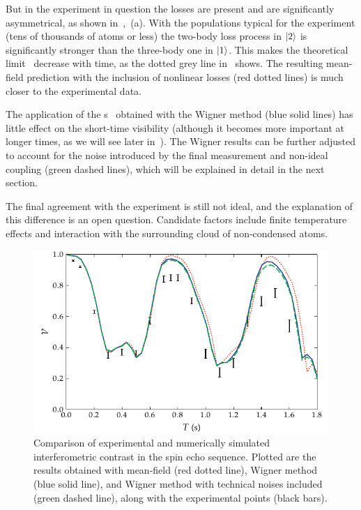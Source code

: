 But in the experiment in question the losses are present and are significantly asymmetrical, as shown in~,~(a).
With the populations typical for the experiment (tens of thousands of atoms or less) the two-body loss process in $\mbox{\ensuremath{\vert 2 \rangle}}$ is significantly stronger than the three-body one in $\mbox{\ensuremath{\vert 1 \rangle}}$.
This makes the theoretical limit~ decrease with time, as the dotted grey line in~ shows.
The resulting mean-field prediction with the inclusion of nonlinear losses (red dotted lines) is much closer to the experimental data.

The application of the s~ obtained with the Wigner method (blue solid lines) has little effect on the short-time visibility (although it becomes more important at longer times, as we will see later in~).
The Wigner results can be further adjusted to account for the noise introduced by the final measurement and non-ideal coupling (green dashed lines), which will be explained in detail in the next section.

The final agreement with the experiment is still not ideal, and the explanation of this difference is an open question.
Candidate factors include finite temperature effects and interaction with the surrounding cloud of non-condensed atoms.

\begin{figure}
    \centerline{\includegraphics{figures_generated/bec_noise/echo_visibility_short.pdf}}

    \caption{Comparison of experimental and numerically simulated interferometric contrast in the spin echo sequence.
    Plotted are the results obtained with mean-field (red dotted line), Wigner method (blue solid line), and Wigner method with technical noises included (green dashed line), along with the experimental points (black bars).}

    \label{fig:bec-noise:visibility:echo-visibility}
\end{figure}

